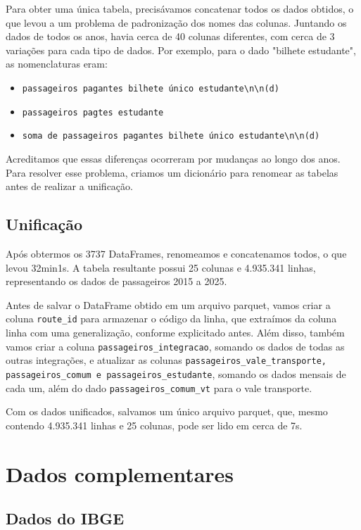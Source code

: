 Para obter uma única tabela, precisávamos concatenar todos os dados obtidos, o que levou a um problema de padronização dos nomes das colunas. Juntando os dados de todos os anos, havia cerca de 40 colunas diferentes, com cerca de 3 variações para cada tipo de dados. Por exemplo, para o dado "bilhete estudante", as nomenclaturas eram:

\begin{itemize}
\item \verb|passageiros pagantes bilhete único estudante\n\n(d)|
\item \verb|passageiros pagtes estudante|
\item \verb|soma de passageiros pagantes bilhete único estudante\n\n(d)|
\end{itemize}

Acreditamos que essas diferenças ocorreram por mudanças ao longo dos anos. Para resolver esse problema, criamos um dicionário para renomear as tabelas antes de realizar a unificação.


\subsection{Unificação}

Após obtermos os 3737 DataFrames, renomeamos e concatenamos todos, o que levou 32min1s. A tabela resultante possui 25 colunas e 4.935.341 linhas, representando os dados de passageiros 2015 a 2025. 

Antes de salvar o DataFrame obtido em um arquivo parquet, vamos criar a coluna \verb|route_id| para armazenar o código da linha, que extraímos da coluna linha com uma generalização, conforme explicitado antes. Além disso, também vamos criar a coluna \verb|passageiros_integracao|, somando os dados de todas as outras integrações, e atualizar as colunas \verb|passageiros_vale_transporte, passageiros_comum e passageiros_estudante|, somando os dados mensais de cada um, além do dado \verb|passageiros_comum_vt| para o vale transporte.

Com os dados unificados, salvamos um único arquivo parquet, que, mesmo contendo 4.935.341 linhas e 25 colunas, pode ser lido em cerca de 7s.

\section{Dados complementares}


\subsection{Dados do IBGE}\label{sec:ibge}

